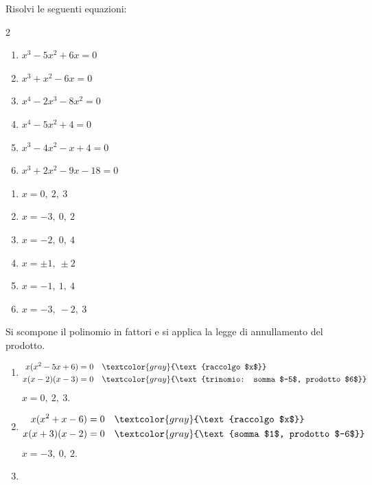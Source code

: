
\begin{question}[ID=4.3, subtitle={Equazioni di grado superiore al secondo mediante scomposizione}, difficulty=media, tags={equazioni di grado superiore}]
Risolvi le seguenti equazioni:
\begin{multicols}{2}
\begin{enumerate}[leftmargin=3cm]
    \item $x^3 - 5x^2 + 6x = 0$
    \item $x^3 + x^2 - 6x = 0$
    \item $x^4 - 2x^3 - 8x^2 = 0$
    \item $x^4 - 5x^2 + 4 = 0$
    \item $x^3 - 4x^2 - x + 4 = 0$
    \item $x^3 + 2x^2 - 9x - 18 = 0$
\end{enumerate}
\end{multicols}
\begin{solution}
\begin{enumerate}
    \item $x=0,\ 2,\ 3$
    \item $x=-3,\ 0,\ 2$
    \item $x=-2,\ 0,\ 4$
    \item $x=\pm1,\ \pm2$
    \item $x=-1,\ 1,\ 4$
    \item $x=-3,\ -2,\ 3$
\end{enumerate}
\end{solution}
\begin{explanation}
Si scompone il polinomio in fattori e si applica la legge di annullamento del prodotto.
\begin{enumerate}
    \item \[\begin{aligned}
    x(x^2-5x+6) &= 0 && \textcolor{gray}{\text{raccolgo $x$}}\\
    x(x-2)(x-3) &= 0 && \textcolor{gray}{\text{trinomio: somma $-5$, prodotto $6$}}
    \end{aligned}\]
    $x=0,\ 2,\ 3$.
    \item \[\begin{aligned}
    x(x^2+x-6) &= 0 && \textcolor{gray}{\text{raccolgo $x$}}\\
    x(x+3)(x-2) &= 0 && \textcolor{gray}{\text{somma $1$, prodotto $-6$}}
    \end{aligned}\]
    $x=-3,\ 0,\ 2$.
    \item \[\begin{aligned}

\end{aligned}\]
\end{enumerate}
\end{explanation}
\end{question}
